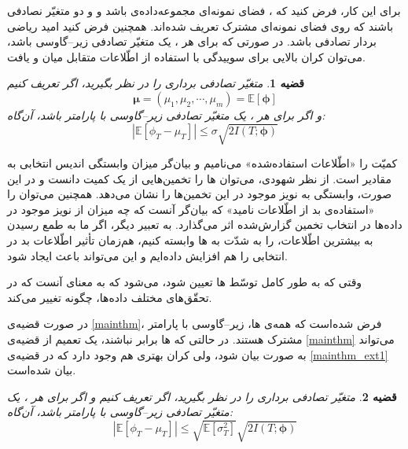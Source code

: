 \documentclass[a4paper,12pt]{article}
\newtheorem{thm}{{\large\bf قضیه}}[section]
\newcommand{\E}{\mathbb{E}}
\newcommand{\bfphi}{\bm {\phi}}
\begin{document}
	برای این کار، فرض کنید که
	\lr{$\Omega$}،
	فضای نمونه‌ای مجموعه‌داده‌ی
	باشد و
	و
	دو متغیّر نصادفی باشند که روی فضای نمونه‌‌ای مشترک
	\lr{$\Omega$}
	تعریف شده‌اند. همچنین فرض کنید
	\lr{$\bm{\mu} = (\mu_1,\mu_2,\cdots,\mu_m)\triangleq\E[\bm{\phi}]$}
	امید ریاضی بردار تصادفی
	\lr{$\bm{\phi}$}
	باشد. در صورتی که برای هر
	،
	یک متغیّر تصادفی زیر--گاوسی باشد، می‌توان کران بالایی برای سوییدگی با استفاده از اطّلاعات متقابل میان 
	و
	\lr{$\bm{\phi}$}
	یافت.
	\begin{thm}\label{mainthm}
		متغیّر تصادفی برداری
		\lr{$\bfphi = (\phi_1,\cdots,\phi_m)$}
		را در نظر بگیرید، اگر تعریف کنیم
		\[\bm{\mu} = (\mu_1,\mu_2,\cdots,\mu_m)=\E[\bm{\phi}]\]
		و اگر برای هر
		،
		یک متغیّر تصادفی زیر--گاوسی با پارامتر
		\lr{$\sigma$}
		باشد، آن‌گاه:
		\begin{equation}
		|\E[\phi_T-\mu_T]|\leq \sigma\sqrt{2I(T;\bm{\phi})}
		\end{equation}
	\end{thm}
	
	
	کمیّت 
	\lr{$I(T;\bfphi)$}
	را «اطّلاعات استفاده‌شده» می‌نامیم و بیان‌گر میزان وابستگی اندیس انتخابی
	به مقادیر
	است. از نظر شهودی، می‌توان
	ها
	را تخمین‌هایی از یک کمیت دانست و در این صورت،
	\lr{$I(T;\bfphi)$}
	وابستگی 
	به نویز موجود در این تخمین‌ها را نشان می‌دهد. همچنین می‌توان 
	\lr{$I(T;\bfphi)$}
	را «استفاده‌ی بد از اطّلاعات نامید» که بیان‌گر آنست که چه میزان از نویز موجود در داده‌ها
	در انتخاب تخمین گزارش‌شده اثر می‌گذارد. 
	به تعبیر دیگر، اگر ما به طمع رسیدن به بیشترین اطّلاعات،
	را به شدّت به
	ها
	وابسته کنیم، هم‌زمان تأثیر اطّلاعات بد در 
	انتخابی را هم افزایش داده‌ایم و این می‌تواند باعث ایجاد
	شود.
	
	وقتی که 
	به طور کامل توسّط 
	ها
	تعیین شود،
	\lr{$I(T;\bfphi) = H(T)$}
	می‌شود که به معنای آنست که در تحقّق‌های مختلف داده‌ها،
	چگونه تغییر می‌کند.
	
	در صورت قضیه‌ی
	\eqref{mainthm}،
	فرض شده‌است که همه‌ی
	ها،
	زیر--گاوسی با پارامتر مشترک
	هستند. در حالتی که 
	ها
	برابر نباشند، یک تعمیم از قضیه‌ی
	\eqref{mainthm}
	می‌تواند به صورت
	بیان شود، ولی کران بهتری هم وجود دارد که در قضیه‌ی
	\eqref{mainthm_ext1}
	بیان شده‌است.
	\begin{thm}\label{mainthm_ext1}
		متغیّر تصادفی برداری
		\lr{$\bfphi = (\phi_1,\cdots,\phi_m)$}
		را در نظر بگیرید، اگر تعریف کنیم
		\lr{$\bm{\mu} =\E[\bm{\phi}]$}
		و اگر برای هر
		،
		یک متغیّر تصادفی زیر--گاوسی با پارامتر
		باشد، آن‌گاه:
		\begin{equation}
		|\E[\phi_T-\mu_T]|\leq\sqrt{\E[\sigma_T^2]}\sqrt{2I(T;\bm{\phi})}
		\end{equation}
	\end{thm}
	
\end{document}
